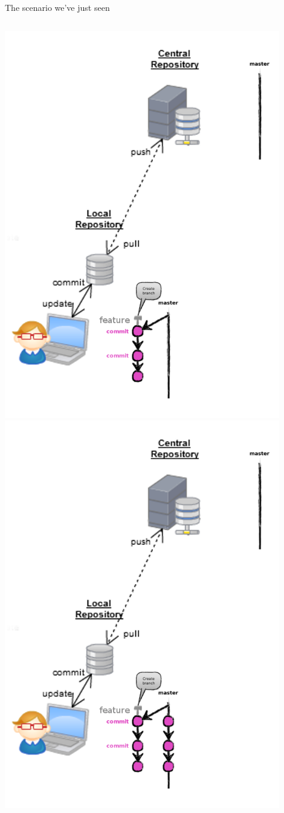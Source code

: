 \begin{frame}[fragile]{The scenario we've just seen}
\begin{columns}
\begin{column}{0.4\textwidth}
\begin{center}
{			}\only<4> {
				\includegraphics[width=0.9\textwidth]{branch_committed.png}
			}\only<5> {
				\includegraphics[width=0.9\textwidth]{branch_rebase.png}
}
\end{center}
\end{column}
\end{columns}
\end{frame}
